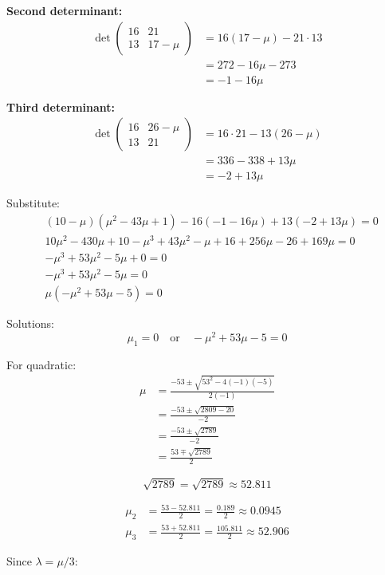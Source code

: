 \documentclass[12pt]{article}
\begin{document}
\begin{solution}
\textbf{Second determinant:}
\begin{align*}
\det\begin{pmatrix}16 & 21 \\ 13 & 17-\mu\end{pmatrix} &= 16(17-\mu) - 21 \cdot 13 \\
&= 272 - 16\mu - 273 \\
&= -1 - 16\mu
\end{align*}

\textbf{Third determinant:}
\begin{align*}
\det\begin{pmatrix}16 & 26-\mu \\ 13 & 21\end{pmatrix} &= 16 \cdot 21 - 13(26-\mu) \\
&= 336 - 338 + 13\mu \\
&= -2 + 13\mu
\end{align*}

Substitute:
\begin{align*}
&(10-\mu)(\mu^2 - 43\mu + 1) - 16(-1 - 16\mu) + 13(-2 + 13\mu) = 0 \\
&10\mu^2 - 430\mu + 10 - \mu^3 + 43\mu^2 - \mu + 16 + 256\mu - 26 + 169\mu = 0 \\
&-\mu^3 + 53\mu^2 - 5\mu + 0 = 0 \\
&-\mu^3 + 53\mu^2 - 5\mu = 0 \\
&\mu(-\mu^2 + 53\mu - 5) = 0
\end{align*}

Solutions:
\[
\mu_1 = 0 \quad \text{or} \quad -\mu^2 + 53\mu - 5 = 0
\]

For quadratic:
\begin{align*}
\mu &= \frac{-53 \pm \sqrt{53^2 - 4(-1)(-5)}}{2(-1)} \\
&= \frac{-53 \pm \sqrt{2809 - 20}}{-2} \\
&= \frac{-53 \pm \sqrt{2789}}{-2} \\
&= \frac{53 \mp \sqrt{2789}}{2}
\end{align*}

\[
\sqrt{2789} = \sqrt{2789} \approx 52.811
\]

\begin{align*}
\mu_2 &= \frac{53 - 52.811}{2} = \frac{0.189}{2} \approx 0.0945 \\
\mu_3 &= \frac{53 + 52.811}{2} = \frac{105.811}{2} \approx 52.906
\end{align*}

Since $\lambda = \mu/3$:


\end{solution}
\end{document}
